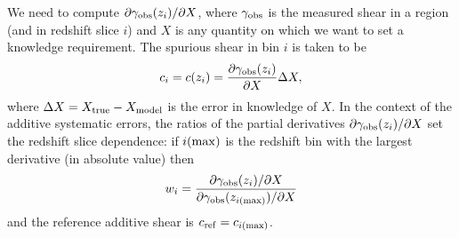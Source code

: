 \documentclass[usenatbib]{mnras}
\begin{document}
We need to compute $\partial\gamma_{\rm obs}(z_i)/\partial X$, where $\gamma_{\rm obs}$ is the measured shear in a region (and in redshift slice $i$) and $X$ is any quantity on which we want to set a knowledge requirement. The spurious shear in bin $i$ is taken to be
\begin{equation}
c_i = c(z_i) = \frac{\partial\gamma_{\rm obs}(z_i)}{\partial X} \Delta X,
\label{eq:X-shape}
\end{equation}
where $\Delta X = X_{\rm true} - X_{\rm model}$ is the error in
knowledge of $X$. In the context of the additive systematic errors,
the ratios of the partial derivatives $\partial\gamma_{\rm
obs}(z_i)/\partial X$ set the redshift slice dependence: if $i({\rm
max})$ is the redshift bin with the largest derivative (in absolute
value) then
\begin{equation}
w_i = \frac{\partial\gamma_{\rm obs}(z_i)/\partial X}{\partial\gamma_{\rm obs}(z_{i({\rm max})})/\partial X}
\end{equation}
and the reference additive shear is $c_{\rm ref} = c_{i({\rm max})}$.
\end{document}
